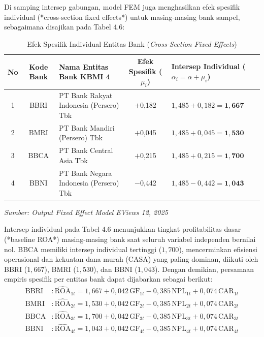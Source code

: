 \documentclass[12pt,a4paper]{article}
\numberwithin{equation}{section}
\begin{document}
\noindent
Di samping intersep gabungan, model FEM juga menghasilkan efek spesifik individual (*cross-section fixed effects*) untuk masing-masing bank sampel, sebagaimana disajikan pada Tabel 4.6:

\begin{table}[H]
  \caption{Efek Spesifik Individual Entitas Bank (\emph{Cross-Section Fixed Effects})}
  \label{tab:fixed_effects_bank}
  \begin{tabularx}{\textwidth}{|c|c|>{\raggedright\arraybackslash}X|c|>{\raggedright\arraybackslash}p{3.8cm}|}
    \hline
    \textbf{No} & \textbf{Kode Bank} & \textbf{Nama Entitas Bank KBMI 4} & \textbf{Efek Spesifik ($\mu_i$)} & \textbf{Intersep Individual ($\alpha_i = \alpha + \mu_i$)} \\
    \hline
    1 & BBRI & PT Bank Rakyat Indonesia (Persero) Tbk & $+$0,182 & $1{,}485 + 0{,}182 = \mathbf{1{,}667}$ \\
    \hline
    2 & BMRI & PT Bank Mandiri (Persero) Tbk & $+$0,045 & $1{,}485 + 0{,}045 = \mathbf{1{,}530}$ \\
    \hline
    3 & BBCA & PT Bank Central Asia Tbk & $+$0,215 & $1{,}485 + 0{,}215 = \mathbf{1{,}700}$ \\
    \hline
    4 & BBNI & PT Bank Negara Indonesia (Persero) Tbk & $-$0,442 & $1{,}485 - 0{,}442 = \mathbf{1{,}043}$ \\
    \hline
  \end{tabularx}
  \begin{flushleft}
    \textit{Sumber: Output Fixed Effect Model EViews 12, 2025}
  \end{flushleft}
\end{table}

\noindent
Intersep individual pada Tabel 4.6 menunjukkan tingkat profitabilitas dasar (*baseline ROA*) masing-masing bank saat seluruh variabel independen bernilai nol. BBCA memiliki intersep individual tertinggi ($1{,}700$), mencerminkan efisiensi operasional dan kekuatan dana murah (CASA) yang paling dominan, diikuti oleh BBRI ($1{,}667$), BMRI ($1{,}530$), dan BBNI ($1{,}043$). Dengan demikian, persamaan empiris spesifik per entitas bank dapat dijabarkan sebagai berikut:
\begin{align}
  \text{BBRI} &: \widehat{\text{ROA}}_{1t} = 1{,}667 + 0{,}042\,\text{GF}_{1t} - 0{,}385\,\text{NPL}_{1t} + 0{,}074\,\text{CAR}_{1t} \\
  \text{BMRI} &: \widehat{\text{ROA}}_{2t} = 1{,}530 + 0{,}042\,\text{GF}_{2t} - 0{,}385\,\text{NPL}_{2t} + 0{,}074\,\text{CAR}_{2t} \\
  \text{BBCA} &: \widehat{\text{ROA}}_{3t} = 1{,}700 + 0{,}042\,\text{GF}_{3t} - 0{,}385\,\text{NPL}_{3t} + 0{,}074\,\text{CAR}_{3t} \\
  \text{BBNI} &: \widehat{\text{ROA}}_{4t} = 1{,}043 + 0{,}042\,\text{GF}_{4t} - 0{,}385\,\text{NPL}_{4t} + 0{,}074\,\text{CAR}_{4t}
\end{align}
\end{document}
